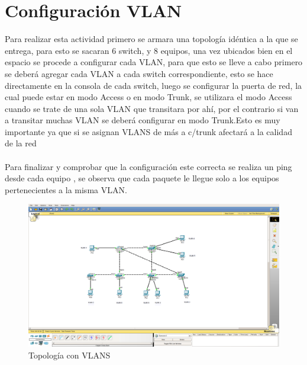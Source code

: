 \documentclass{udpreport}
\begin{document}
	\section{Configuración VLAN}
	    Para realizar esta actividad primero se armara una topología idéntica a la que se entrega, para esto se sacaran 6 switch, y 8 equipos, una vez ubicados bien en el espacio se procede a configurar cada VLAN, para que esto se lleve a cabo primero se deberá agregar cada VLAN a cada switch correspondiente, esto se hace directamente en la consola de cada switch, luego se configurar la puerta de red, la cual puede estar en modo Access o en modo Trunk, se utilizara el modo Access cuando se trate de una sola VLAN que transitara por ahí, por el contrario si van a transitar muchas VLAN se deberá configurar en modo Trunk.Esto es muy importante ya que si se asignan VLANS de más a c/trunk afectará a la calidad de la red\\\\
    Para finalizar y comprobar que la configuración este correcta se realiza un ping desde cada equipo , se observa que cada
	paquete le llegue solo a los equipos pertenecientes a la misma VLAN.\\
	
	\begin{figure}[h]
	\centering
	\includegraphics[width=15cm]{topologia.png}
	\caption{Topología con VLANS}
	\end{figure}\\	
	
\end{document}
